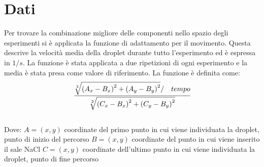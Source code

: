\section{Dati}
Per trovare la combinazione migliore delle componenti nello spazio degli esperimenti si è applicata la funzione di adattamento per il movimento. Questa descrive la velocità media della droplet durante tutto l'esperimento ed è espressa in $1/s$. La funzione è stata applicata a due ripetizioni di ogni esperimento e la media è stata presa come valore di riferimento. La funzione è definita come:
\begin{equation*} 
\cfrac {\sqrt [ 2 ]{ { (A_{ x }-B_{ x }) }^{ 2 }+{ (A_{ y }-B_{ y }) }^{ 2 } } /\quad tempo }{ \sqrt [ 2 ]{ { (C_{ x }-B_{ x }) }^{ 2 }+{ (C_{ y }-B_{ y }) }^{ 2 }}} 
\end{equation*}
\\Dove: $A=(x,y)$ coordinate del primo punto in cui viene individuata la droplet, punto di inizio del percorso
$B=(x,y)$ coordinate del punto in cui viene inserito il sale NaCl
$C=(x,y)$ coordinate dell'ultimo punto in cui viene individuata la droplet, punto di fine percorso






























